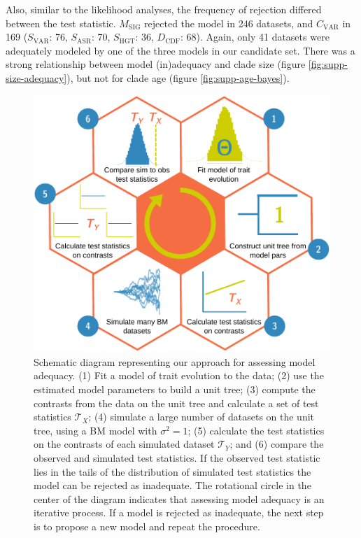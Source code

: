 \documentclass[a4paper,11pt]{article}
\begin{document}
Also, similar to the likelihood analyses, the frequency of rejection differed between the test statistic. $M_{\text{SIG}}$ rejected the model in 246 datasets, and $C_{\text{VAR}}$ in 169 ($S_{\text{VAR}}$: 76, $S_{\text{ASR}}$: 70, $S_{\text{HGT}}$: 36, $D_{\text{CDF}}$: 68). Again, only 41 datasets were adequately modeled by one of the three models in our candidate set. There was a strong relationship between model (in)adequacy and clade size (figure \ref{fig:supp-size-adequacy}), but not for clade age (figure \ref{fig:supp-age-bayes}).
 

\begin{figure}[p]
  \centering
  \includegraphics[scale=0.85]{figs/flow-diagram}
  \caption{Schematic diagram representing our approach for assessing model adequacy. (1) Fit a model of trait evolution to the data; (2) use the estimated model parameters to build a unit tree; (3) compute the contrasts from the data on the unit tree and calculate a set of test statistics $\mathcal{T}_X$; (4) simulate a large number of datasets on the unit tree, using a BM model with $\sigma^2= 1$; (5) calculate the test statistics on the contrasts of each simulated dataset $\mathcal{T}_Y$; and (6) compare the observed and simulated test statistics. If the observed test statistic lies in the tails of the distribution of simulated test statistics the model can be rejected as inadequate. The rotational circle in the center of the diagram indicates that assessing model adequacy is an iterative process. If a model is rejected as inadequate, the next step is to propose a new model and repeat the procedure.}
  \label{fig:flowchart}
\end{figure}
\end{document}
